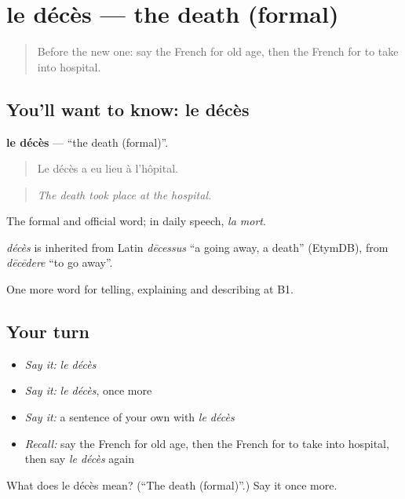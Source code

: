 \section[le décès]{le décès — the death (formal)}

\label{lesson:FR-C313-deces}



\begin{quote}
Before the new one: say the French for old age, then the French for to take into hospital.
\end{quote}

\subsection*{You'll want to know: le décès}
\textbf{le décès} — \textquotedblleft{}the death (formal)\textquotedblright{}.

\begin{quote}
Le décès a eu lieu à l'hôpital.
\end{quote}

\begin{quote}
\emph{The death took place at the hospital.}
\end{quote}

The formal and official word; in daily speech, \emph{la mort}.

\begin{cousinweb}
\emph{décès} is inherited from Latin \emph{dēcessus} \textquotedblleft{}a going away, a death\textquotedblright{} (EtymDB), from \emph{dēcēdere} \textquotedblleft{}to go away\textquotedblright{}.
\end{cousinweb}

\begin{grammarlens}[title={What you've built}]
One more word for telling, explaining and describing at B1.
\end{grammarlens}

\subsection*{Your turn}
\begin{itemize}
\raggedright
  \item \emph{Say it:} \emph{le décès}
  \item \emph{Say it:} \emph{le décès}, once more
  \item \emph{Say it:} a sentence of your own with \emph{le décès}
  \item \emph{Recall:} say the French for old age, then the French for to take into hospital, then say \emph{le décès} again
\end{itemize}

\begin{tcolorbox}[breakable,colback=teal!4,colframe=teal!35!black,title={Before you move on}]
What does le décès mean? (\textquotedblleft{}The death (formal)\textquotedblright{}.) Say it once more.
\end{tcolorbox}
